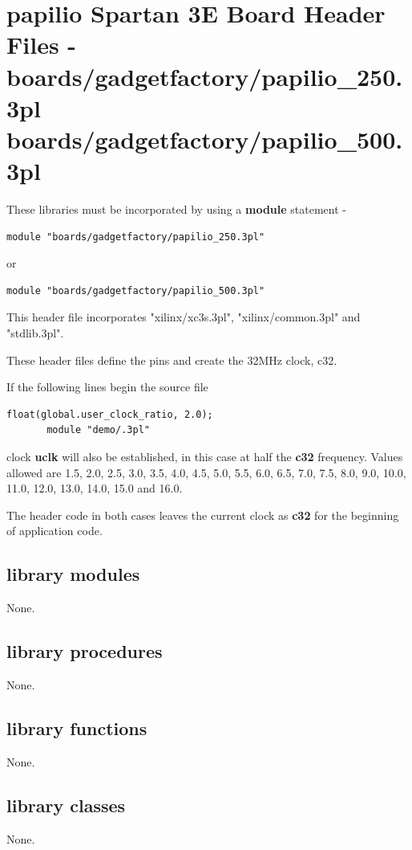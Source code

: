 \pagebreak

\section{papilio Spartan 3E Board Header Files -\\
            boards/gadgetfactory/papilio\_250.3pl\\
            boards/gadgetfactory/papilio\_500.3pl}

    
    These libraries must be incorporated by using a {\bf module} statement -
    \begin{lstlisting}[gobble=4, language=threepl]
       module "boards/gadgetfactory/papilio_250.3pl"
    \end{lstlisting}
    or
    \begin{lstlisting}[gobble=4, language=threepl]
       module "boards/gadgetfactory/papilio_500.3pl"
    \end{lstlisting}
    
    This header file incorporates "xilinx/xc3s.3pl", "xilinx/common.3pl" and
    "stdlib.3pl".
    
    These header files define the pins and create the 32MHz clock, c32.
    
    If the following lines begin the source file
    \begin{lstlisting}[gobble=4, language=threepl]
       float(global.user_clock_ratio, 2.0);
       module "demo/.3pl"
    \end{lstlisting}
    clock {\bf uclk} will also be established, in this case at half the
    {\bf c32} frequency. Values allowed are 1.5, 2.0, 2.5, 3.0, 3.5, 4.0,
    4.5, 5.0, 5.5, 6.0, 6.5, 7.0, 7.5, 8.0, 9.0, 10.0, 11.0, 12.0, 13.0,
    14.0, 15.0 and 16.0.
    
    The header code in both cases leaves the current clock as {\bf c32} for the
    beginning of application code.


    \subsection{library modules}
    
        None.




    \subsection{library procedures}
    
        None.
        


    \subsection{library functions}
    
        None.



    \subsection{library classes}
    
        None.
